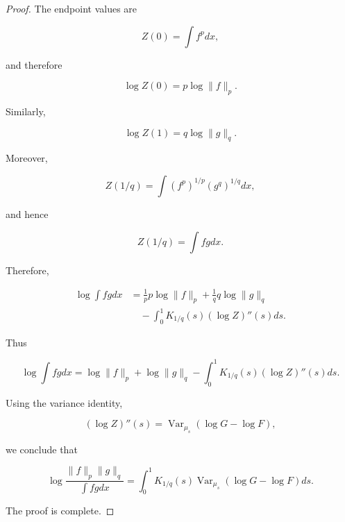 \documentclass[10pt,a4paper]{amsart}
\begin{document}
\begin{proof}
The endpoint values are

\[
Z(0)
=
\int f^p dx ,
\]

and therefore

\[
\log Z(0)
=
p\log\|f\|_p .
\]

Similarly,

\[
\log Z(1)
=
q\log\|g\|_q .
\]

Moreover,

\[
Z(1/q)
=
\int
(f^p)^{1/p}
(g^q)^{1/q}dx ,
\]

and hence

\[
Z(1/q)
=
\int fg dx .
\]


Therefore,

\[
\begin{aligned}
\log\int fg dx
&=
\frac1p
p\log\|f\|_p
+
\frac1q
q\log\|g\|_q
\\
&\quad
-
\int_0^1
K_{1/q}(s)
(\log Z)''(s)ds .
\end{aligned}
\]

Thus

\[
\log\int fg dx
=
\log\|f\|_p
+
\log\|g\|_q
-
\int_0^1
K_{1/q}(s)
(\log Z)''(s)ds .
\]

Using the variance identity,

\[
(\log Z)''(s)
=
\operatorname{Var}_{\mu_s}
(
\log G-\log F
),
\]

we conclude that

\[
\log
\frac{
\|f\|_p\|g\|_q
}{
\int fg dx
}
=
\int_0^1
K_{1/q}(s)
\operatorname{Var}_{\mu_s}
(
\log G-\log F
)
ds .
\]

The proof is complete.

\end{proof}
\end{document}
